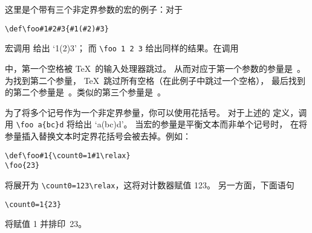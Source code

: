 \documentclass[letterpaper]{book}
\begin{document}
这里是个带有三个非定界参数的宏的例子：对于
\begin{verbatim}
\def\foo#1#2#3{#1(#2)#3}
\end{verbatim}
宏调用  给出 `\hbox{1(2)3}'；
而 \hbox{\verb-\foo 1 2 3-} 给出同样的结果。在调用
\begin{disp}\end{disp}
中，第一个空格被 \TeX\ 的输入处理器跳过。
从而对应于第一个参数的参量是~。为找到第二个参量，
\TeX\ 跳过所有空格（在此例子中跳过一个空格），
最后找到的第二个参量是~。类似的第三个参量是~。


为了将多个记号作为一个非定界参量，你可以使用花括号。
对于上述的  定义，调用 \verb>\foo a{bc}d> 将给出 `\hbox{a(bc)d}'。
当宏的参量是平衡文本而非单个记号时，
在将参量插入替换文本时定界花括号会被去掉。例如：
\begin{verbatim}
\def\foo#1{\count0=1#1\relax}
\foo{23}
\end{verbatim}
将展开为 \verb>\count0=123\relax>，这将对计数器赋值 123。
另一方面，下面语句
\begin{verbatim}
\count0=1{23}
\end{verbatim}
将赋值 1 并排印~23。
\end{document}
